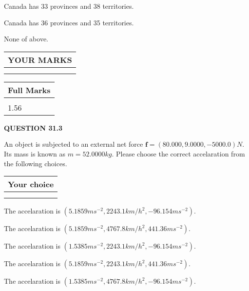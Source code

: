 \documentclass[12pt]{article}
\begin{document}
 
Canada has  %
33 provinces and  %
38 territories.
 
 
Canada has  %
36 provinces and  %
35 territories.
 
 
 None of above.
 
 
  
\vspace{0.2in}
  
\noindent\begin{tabular}{|l|}
\hline
 YOUR MARKS  \\
\hline
 \\ 
 \\ 
\hline
\end{tabular}
\hspace{0.05in} \begin{tabular}{|l|}
\hline
 Full Marks  \\
\hline
 \\ 
1.56 \\
\hline
\end{tabular}
{\textbf{\Large{QUESTION
31.3 
}}}
  
  
 
An object is subjected to an external net force $\mathbf{f}=(
80.000 ,
9.0000,
-5000.0  )N$. Its mass is known as
$m= %
52.0000  kg$. Please choose the correct accelaration
from the following choices.
 
  
  
\noindent\hspace{3.0in} \begin{tabular}{|l|}
\hline
Your choice \\
\hline
 \\ 
 \\ 
\hline
\end{tabular}
  
  
 
 
The accelaration is
$(
5.1859ms^{-2},
2243.1km/h^2,
-96.154ms^{-2}
).
$
 
 
The accelaration is
$(
5.1859ms^{-2},
4767.8km/h^2,
441.36ms^{-2}
).
$
 
 
The accelaration is
$(
1.5385ms^{-2},
2243.1km/h^2,
-96.154ms^{-2}
).
$
 
 
The accelaration is
$(
5.1859ms^{-2},
2243.1km/h^2,
441.36ms^{-2}
).
$
 
 
The accelaration is
$(
1.5385ms^{-2},
4767.8km/h^2,
-96.154ms^{-2}
).
$
 
\end{document}
